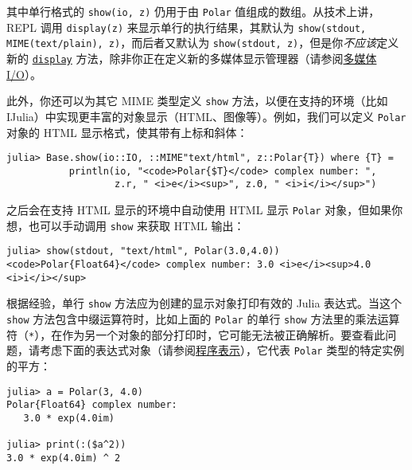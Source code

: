 其中单行格式的 \texttt{show(io, z)} 仍用于由 \texttt{Polar} 值组成的数组。从技术上讲，REPL 调用 \texttt{display(z)} 来显示单行的执行结果，其默认为 \texttt{show(stdout, MIME({\textquotedbl}text/plain{\textquotedbl}), z)}，而后者又默认为 \texttt{show(stdout, z)}，但是你\emph{不应该}定义新的 \hyperlink{12073120410747960438}{\texttt{display}} 方法，除非你正在定义新的多媒体显示管理器（请参阅\hyperlink{9485638019478733873}{多媒体 I/O}）。



此外，你还可以为其它 MIME 类型定义 \texttt{show} 方法，以便在支持的环境（比如 IJulia）中实现更丰富的对象显示（HTML、图像等）。例如，我们可以定义 \texttt{Polar} 对象的 HTML 显示格式，使其带有上标和斜体：




\begin{verbatim}
julia> Base.show(io::IO, ::MIME"text/html", z::Polar{T}) where {T} =
           println(io, "<code>Polar{$T}</code> complex number: ",
                   z.r, " <i>e</i><sup>", z.Θ, " <i>i</i></sup>")
\end{verbatim}



之后会在支持 HTML 显示的环境中自动使用 HTML 显示 \texttt{Polar} 对象，但如果你想，也可以手动调用 \texttt{show} 来获取 HTML 输出：




\begin{verbatim}
julia> show(stdout, "text/html", Polar(3.0,4.0))
<code>Polar{Float64}</code> complex number: 3.0 <i>e</i><sup>4.0 <i>i</i></sup>
\end{verbatim}





根据经验，单行 \texttt{show} 方法应为创建的显示对象打印有效的 Julia 表达式。当这个 \texttt{show} 方法包含中缀运算符时，比如上面的 \texttt{Polar} 的单行 \texttt{show} 方法里的乘法运算符（\texttt{*}），在作为另一个对象的部分打印时，它可能无法被正确解析。要查看此问题，请考虑下面的表达式对象（请参阅\hyperlink{10559372927865899180}{程序表示}），它代表 \texttt{Polar} 类型的特定实例的平方：




\begin{verbatim}
julia> a = Polar(3, 4.0)
Polar{Float64} complex number:
   3.0 * exp(4.0im)

julia> print(:($a^2))
3.0 * exp(4.0im) ^ 2
\end{verbatim}



